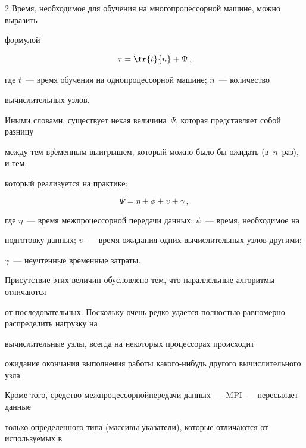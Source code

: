 \begin{multicols}{2}
 Время, необходимое для обучения на многопроцессорной машине, можно выразить


формулой


 \begin{equation*}


 \tau = \fr{t}{n}+\Psi\,,




 \end{equation*}


где $t$~--- время обучения на однопроцессорной машине; $n$~--- количество


вычислительных узлов.





Иными словами, существует некая величина~$\Psi$, которая представляет собой разницу


между тем вр$\acute{\mbox{е}}$менным выигрышем, который можно было бы ожидать (в~$n$~раз), и тем,


который реализуется на практике:


\begin{equation*}


\Psi = \eta+\phi+\upsilon+\gamma\,,




\end{equation*}


где $\eta$~--- время межпроцессорной передачи данных; $\psi$~--- время, необходимое на


подготовку данных; $\upsilon$~--- время ожидания одних вычислительных узлов другими;


$\gamma$~--- неучтенные временные затраты.





 Присутствие этих величин обусловлено тем, что параллельные алгоритмы отличаются


от последовательных. Поскольку очень редко удается пол\-ностью равномерно распределить нагрузку на\linebreak


вычислительные узлы, всегда на некоторых процессорах происходит


ожидание окончания выполнения работы какого-нибудь другого вычислительного узла.


Кроме того, средство межпроцессорной\linebreak передачи данных~--- MPI~--- пересылает данные


только определенного типа (массивы-указатели), которые отличаются от используемых в



\end{multicols}
